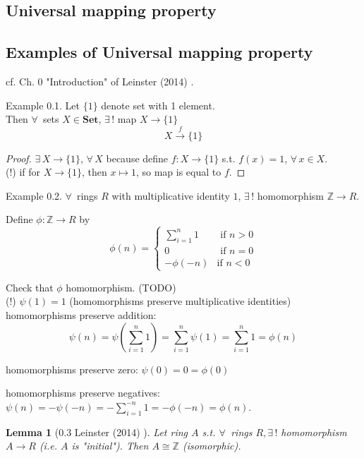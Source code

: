 \documentclass[10pt]{amsart}
\newtheorem{lemma}{Lemma}
\begin{document}
\begin{multicols*}{2}
\section{Universal mapping property}

\subsection{Examples of Universal mapping property}

cf. Ch. 0 "Introduction" of Leinster (2014) \cite{Lein2014}.

Example 0.1. Let $\lbrace 1 \rbrace$ denote set with 1 element. \\
Then $\forall \, $ sets $X \in \textbf{Set}$, $\exists \, ! $ map $X \to \lbrace 1 \rbrace$
\[
X \xrightarrow{ f} \lbrace 1 \rbrace 
\]

\begin{proof}
$\exists \, X \to \lbrace 1 \rbrace$, $\forall \, X$ because define $f: X \to \lbrace 1 \rbrace$ s.t. $f(x) = 1$, $\forall \, x \in X$. \\
(!) if for $X \to \lbrace 1 \rbrace$, then $x\mapsto 1$, so map is equal to $f$.
\end{proof} 

Example 0.2. $\forall \, $ rings $R$ with multiplicative identity $1$, $\exists \, !$ homomorphism $\mathbb{Z} \to R$. \label{Example:integerringhomomorphism}

Define $\phi : \mathbb{Z} \to R$ by 
\[
\phi(n) = \begin{cases}  \sum_{i=1}^n 1 & \text{ if } n > 0 \\ 
0 & \text{ if } n = 0 \\
-\phi(-n) & \text{if } n < 0 \end{cases} 
\]

Check that $\phi$ homomorphism. (TODO)\\

(!) $\psi(1)= 1$ (homomorphisms preserve multiplicative identities) \\
homomorphisms preserve addition:
\[
\psi(n) = \psi(\sum_{i=1}^n 1) = \sum_{i=1}^n \psi(1) = \sum_{i = 1}^n 1 = \phi(n)
\]

homomorphisms preserve zero: $\psi(0) = 0 = \phi(0)$

homomorphisms preserve negatives: $\psi(n) = -\psi(-n) = -\sum_{i=1}^{-n} 1 = -\phi(-n) = \phi(n)$.

\begin{lemma}[0.3 Leinster (2014) \cite{Lein2014}]
	Let ring $A$ s.t. $\forall \,$ rings $R, \exists \, !$ homomorphism $A \to R$ (i.e. $A$ is "initial"). Then $A \cong \mathbb{Z}$ (isomorphic). 	
\end{lemma}


\end{multicols*}
\end{document}
